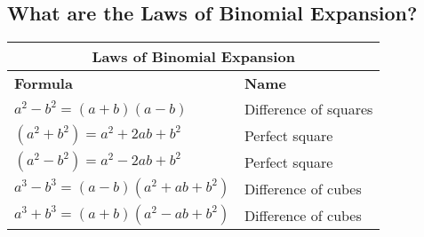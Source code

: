 \subsection{What are the Laws of Binomial Expansion?}

\begin{small}
    \begin{tabularx}{1\textwidth}{
            p{}
            p{}
        }
        \toprule
        \multicolumn{2}{c}{\textbf{Laws of Binomial Expansion}} \\
        \midrule

        \textbf{Formula} & \textbf{Name}\\
        \midrule

        $ a^{2} - b^{2} = \left(a + b \right)\left(a - b \right) $
        &
        Difference of squares
        \\
        \midrule

        $ \left(a^{2} + b^{2}\right) = a^{2} + 2ab + b^{2} $
        &
        Perfect square
        \\
        \midrule
        
        $ \left(a^{2} - b^{2}\right) = a^{2} - 2ab + b^{2} $
        &
        Perfect square
        \\
        \midrule

        $ a^{3} - b^{3} = \left(a - b \right)\left(a^{2} + ab +  b^{2} \right) $
        &
        Difference of cubes
        \\
        \midrule

        $ a^{3} + b^{3} = \left(a + b \right)\left(a^{2} - ab +  b^{2} \right) $
        &
        Difference of cubes
        \\
        \bottomrule
    \end{tabularx}
\end{small}
